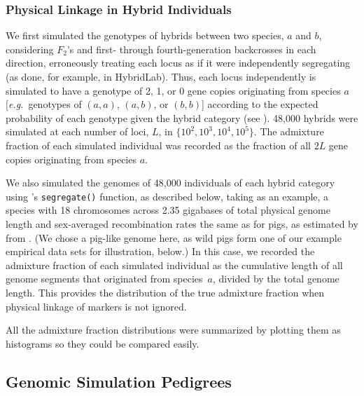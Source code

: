 


\subsubsection*{Physical Linkage in Hybrid Individuals}

We first simulated the genotypes of hybrids between two species, $a$ and $b$,
considering $F_2$'s and first- through
fourth-generation backcrosses in each direction, erroneously treating each
locus as if it were independently segregating (as done, for example, in {\sc HybridLab}). Thus,
each locus independently is simulated to have a genotype of 2, 1, or 0 gene copies originating from species $a$ [{\em e.g.}~genotypes of $(a,a)$, $(a,b)$, or $(b,b)$] according to the expected
probability of each genotype given the hybrid category (see \citealt{anderson2002model}).
48,000 hybrids were simulated at each number of loci, $L$, in $\{10^2, 10^3, 10^4, 10^5\}$.
The admixture fraction of each simulated individual was recorded as the fraction of all $2L$
gene copies originating from species $a$.  

We also simulated the genomes of 48,000 individuals of each
hybrid category using \gscramble{}'s {\footnotesize\tt segregate()} function, as described
below, taking as an example, a species with 18 chromosomes across 2.35 gigabases of total physical genome length
and sex-averaged recombination rates the same as for pigs, as estimated by from \citet{tortereau2012high}. (We chose
a pig-like genome here, as wild pigs form one of our example empirical data sets for illustration, below.)  In this case, we recorded the
admixture fraction of each simulated individual as the cumulative length of all genome segments
that originated from species~$a$, divided by the total genome length.
This provides the distribution of the true admixture fraction
when physical linkage of markers is not ignored.  

All the admixture fraction distributions were summarized by plotting them as histograms
so they could be compared easily.  


\subsection*{Genomic Simulation Pedigrees}


